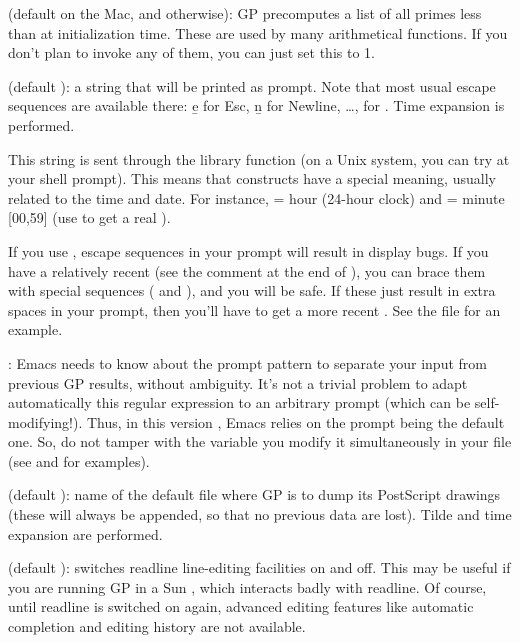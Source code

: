  (default  on the Mac, and 
otherwise): GP precomputes a list of all primes less than 
at initialization time. These are used by many arithmetical functions. If
you don't plan to invoke any of them, you can just set this to 1.

 (default ): a string that will be printed as
prompt. Note that most usual escape sequences are available there: \b{e} for
Esc, \b{n} for Newline, \dots, \kbd{\bs\bs} for \kbd{\bs}. Time expansion is
performed.

This string is sent through the library function  (on a
Unix system, you can try  at your shell prompt). This means
that \kbd{\%} constructs have a special meaning, usually related to the time
and date. For instance,  = hour (24-hour clock) and  =
minute [00,59] (use \kbd{\%\%} to get a real \kbd{\%}).

If you use , escape sequences in your prompt will result in
display bugs. If you have a relatively recent  (see the comment
at the end of ), you can brace them with special sequences
(\kbd{\bs[} and \kbd{\bs]}), and you will be safe. If these just result in
extra spaces in your prompt, then you'll have to get a more recent
. See the file  for an example.

: Emacs needs to know about the prompt pattern to
separate your input from previous GP results, without ambiguity. It's not a
trivial problem to adapt automatically this regular expression to an
arbitrary prompt (which can be self-modifying!). Thus, in this version \vers,
Emacs relies on the prompt being the default one. So, do not tamper with the
 variable  you modify it simultaneously in your
 file (see  and  for
examples).

 (default ): name of the default file where
GP is to dump its PostScript drawings (these will always be appended, so that
no previous data are lost). Tilde and time expansion are performed.

 (default ): switches readline line-editing
facilities on and off. This may be useful if you are running GP in a Sun
, which interacts badly with readline. Of course, until readline
is switched on again, advanced editing features like automatic completion
and editing history are not available.

